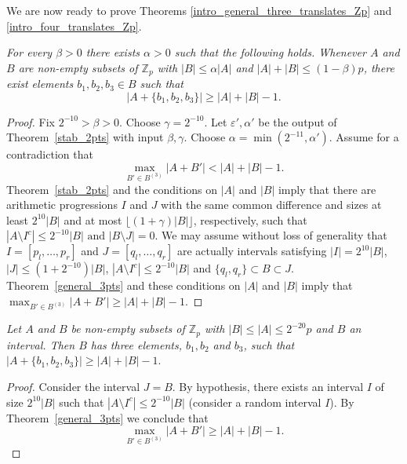 \documentclass[12pt,reqno]{amsart}
\theoremstyle{definition}
\renewcommand\leq{\leqslant}
\renewcommand\geq{\geqslant}
\renewcommand\ge{\geqslant}
\begin{document}
\vspace{5pt}
We are now ready to prove Theorems \ref{intro_general_three_translates_Zp}
and  \ref{intro_four_translates_Zp}.

\vspace{7pt}
 {\em
For every $\beta>0$ there exists $\alpha>0$ such that the following holds.
Whenever $A$ and $B$ are non-empty subsets of
$\mathbb{Z}_p$ with $|B| \leq \alpha |A|$ and $|A|+|B| \leq (1-\beta)p$,
there exist
elements $b_1,b_2,b_3 \in B$ such that
$$|A+\{b_1, b_2,b_3\}| \ge |A|+|B|-1.$$
}

\begin{proof}
  Fix $2^{-10}>\beta>0$. Choose $\gamma=2^{-10}$. Let $\varepsilon', \alpha'$ be the output of Theorem~\ref{stab_2pts} with input $\beta, \gamma$. Choose $\alpha=\min(2^{-11},\alpha')$. Assume for a
  contradiction that
\begin{equation}\label{eq40.0}
    \max_{B'\in B^{(3)}} |A+B'|<|A|+|B|-1.
\end{equation}
Theorem~\ref{stab_2pts} and the conditions on $|A|$ and $|B|$ imply that there are arithmetic progressions $I$ and $J$ with the same common difference and sizes at least $2^{10}|B|$ and at most $\lfloor(1+\gamma)|B|\rfloor$, respectively, such that $|A\setminus I^c| \leq 2^{-10} |B| \text{ and } |B\setminus J| =0.$
We may assume without loss of generality that $I=[p_l, \hdots, p_r]$ and $J=[q_l, \hdots, q_r]$ are actually intervals
satisfying
$|I|=2^{10}|B|$,  $|J| \leq (1+2^{-10})|B|$,
$|A\setminus I^c| \leq 2^{-10} |B|$ and $\{q_l,q_r\} \subset B \subset J$.
Theorem~\ref{general_3pts} and these conditions on $|A|$ and $|B|$ imply that
$ \max_{B'\in B^{(3)}} |A+B'| \geq |A|+|B|-1.$
\end{proof}

\vspace{7pt}
 {\em
Let $A$ and $B$ be non-empty subsets of $\mathbb{Z}_p$ with
$ |B| \leq |A| \leq 2^{-20}p$ and $B$ an interval.
Then $B$ has three elements, $b_1, b_2$ and $b_3$,
such that $|A+\{b_1, b_2,b_3\}| \ge |A|+|B|-1.$
}

\begin{proof}
Consider the interval $J=B$. By hypothesis, there exists an interval $I$ of size $2^{10}|B|$ such that $|A\setminus I^c| \leq 2^{-10}|B|$ (consider a random interval $I$). By Theorem~\ref{general_3pts} we conclude that
$$ \max_{B'\in B^{(3)}} |A+B'| \geq |A|+|B|-1.$$
\end{proof}
\end{document}
